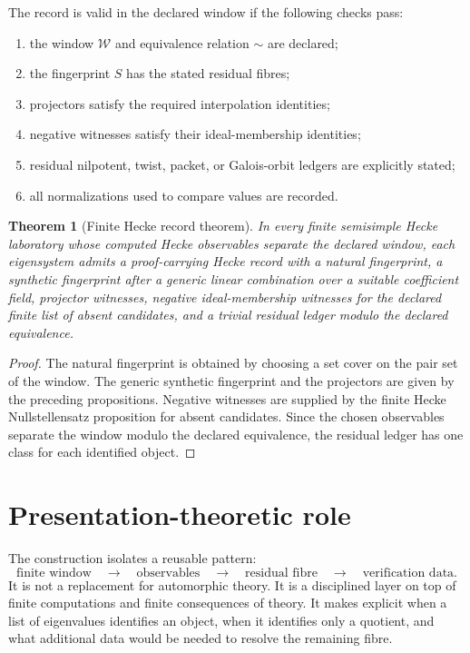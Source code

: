 \documentclass[11pt]{article}
\newtheorem{theorem}{Theorem}[section]
\begin{document}
The record is valid in the declared window if the following checks pass:
\begin{enumerate}[label=\textup{(\roman*)}]
\item the window \(\mathcal W\) and equivalence relation \(\sim\) are declared;
\item the fingerprint \(S\) has the stated residual fibres;
\item projectors satisfy the required interpolation identities;
\item negative witnesses satisfy their ideal-membership identities;
\item residual nilpotent, twist, packet, or Galois-orbit ledgers are explicitly stated;
\item all normalizations used to compare values are recorded.
\end{enumerate}

\begin{theorem}[Finite Hecke record theorem]
In every finite semisimple Hecke laboratory whose computed Hecke observables separate the declared window, each eigensystem admits a proof-carrying Hecke record with a natural fingerprint, a synthetic fingerprint after a generic linear combination over a suitable coefficient field, projector witnesses, negative ideal-membership witnesses for the declared finite list of absent candidates, and a trivial residual ledger modulo the declared equivalence.
\end{theorem}

\begin{proof}
The natural fingerprint is obtained by choosing a set cover on the pair set of the window.  The generic synthetic fingerprint and the projectors are given by the preceding propositions.  Negative witnesses are supplied by the finite Hecke Nullstellensatz proposition for absent candidates.  Since the chosen observables separate the window modulo the declared equivalence, the residual ledger has one class for each identified object.
\end{proof}

\section{Presentation-theoretic role}

The construction isolates a reusable pattern:
\[
\text{finite window}
\quad\longrightarrow\quad
\text{observables}
\quad\longrightarrow\quad
\text{residual fibre}
\quad\longrightarrow\quad
\text{verification data}.
\]
It is not a replacement for automorphic theory.  It is a disciplined layer on top of finite computations and finite consequences of theory.  It makes explicit when a list of eigenvalues identifies an object, when it identifies only a quotient, and what additional data would be needed to resolve the remaining fibre.
\end{document}
